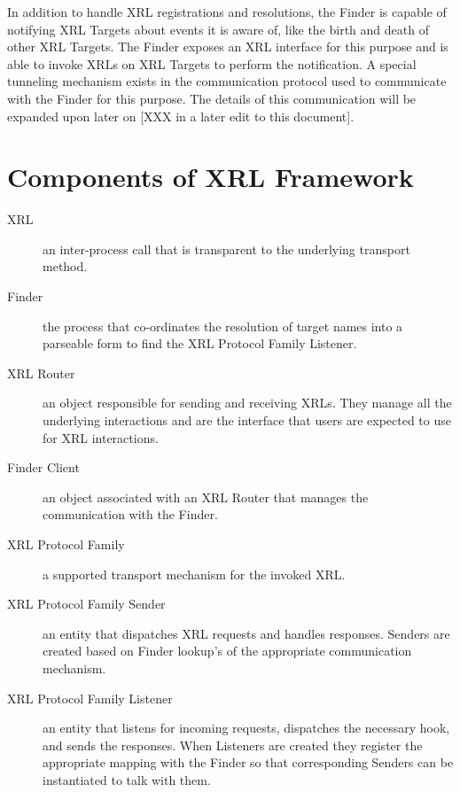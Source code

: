 \documentclass[11pt]{article}
\begin{document}
In addition to handle XRL registrations and resolutions, the Finder is
capable of notifying XRL Targets about events it is aware of, like the
birth and death of other XRL Targets.  The Finder exposes an XRL
interface for this purpose and is able to invoke XRLs on XRL Targets
to perform the notification.  A special tunneling mechanism exists in
the communication protocol used to communicate with the Finder for
this purpose.  The details of this communication will be expanded upon
later on [XXX in a later edit to this document].

\section{Components of XRL Framework}

\begin{description}

  \item [XRL] an inter-process call that is transparent to the
  underlying transport method.

  \item [Finder] the process that co-ordinates the resolution of target
  names into a parseable form to find the XRL Protocol Family Listener.

  \item [XRL Router] an object responsible for sending and receiving
  XRLs.  They manage all the underlying interactions and are the
  interface that users are expected to use for XRL interactions.

  \item [Finder Client] an object associated with an XRL Router that
  manages the communication with the Finder.

  \item [XRL Protocol Family] a supported transport mechanism for the
  invoked XRL.

  \item [XRL Protocol Family Sender] an entity that dispatches XRL
  requests and handles responses.  Senders are created based on Finder
  lookup's of the appropriate communication mechanism.

  \item [XRL Protocol Family Listener] an entity that listens for
  incoming requests, dispatches the necessary hook, and sends the
  responses.  When Listeners are created they register the appropriate
  mapping with the Finder so that corresponding Senders can be
  instantiated to talk with them.

\end{description}
\end{document}
